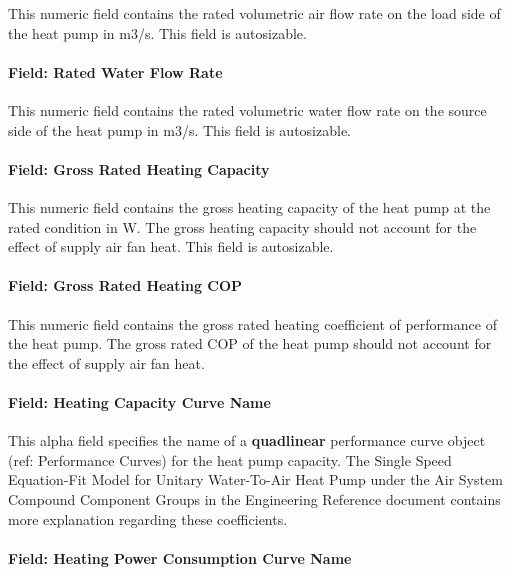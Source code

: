 This numeric field contains the rated volumetric air flow rate on the load side of the heat pump in m3/s. This field is autosizable.

\paragraph{Field: Rated Water Flow Rate}\label{field-rated-water-flow-rate-1}

This numeric field contains the rated volumetric water flow rate on the source side of the heat pump in m3/s. This field is autosizable.

\paragraph{Field: Gross Rated Heating Capacity}\label{field-gross-rated-heating-capacity-4}

This numeric field contains the gross heating capacity of the heat pump at the rated condition in W. The gross heating capacity should not account for the effect of supply air fan heat. This field is autosizable.

\paragraph{Field: Gross Rated Heating COP}\label{field-gross-rated-heating-cop-1}

This numeric field contains the gross rated heating coefficient of performance of the heat pump. The gross rated COP of the heat pump should not account for the effect of supply air fan heat.

\paragraph{Field: Heating Capacity Curve Name}\label{field-heating-capacity-curve-name}

This alpha field specifies the name of a \textbf{quadlinear} performance curve object (ref: Performance Curves) for the heat pump capacity. The Single Speed Equation-Fit Model for Unitary Water-To-Air Heat Pump under the Air System Compound Component Groups in the Engineering Reference document contains more explanation regarding these coefficients.

\paragraph{Field: Heating Power Consumption Curve Name}\label{field-heating-power-consumption-curve-name}

